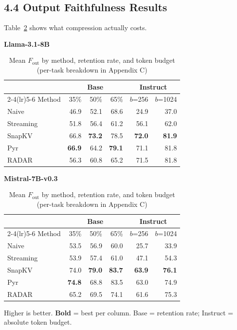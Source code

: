 \documentclass[10pt,letterpaper]{article}
\begin{document}
\hypertarget{output-faithfulness-results}{%
\subsection{4.4 Output Faithfulness
Results}\label{output-faithfulness-results}}

Table~\ref{tab:t4} shows what compression actually costs.

\begin{table}[H]
\centering
\small
\captionsetup{justification=centering}
\caption{Mean \(F_{\text{out}}\) by method, retention rate, and token budget (per-task breakdown in Appendix C)}
\label{tab:t4}
\begin{minipage}[t]{0.49\textwidth}
\centering
\textbf{Llama-3.1-8B}\\[0.4em]
\begin{tabular}{@{}lrrrrr@{}}
\toprule
& \multicolumn{3}{c}{Base} & \multicolumn{2}{c}{Instruct}\\
\cmidrule(lr){2-4}\cmidrule(lr){5-6}
Method & 35\% & 50\% & 65\% & $b$=256 & $b$=1024\\
\midrule
Naive      & 46.9 & 52.1 & 68.6 & 24.9 & 37.0\\
Streaming  & 51.8 & 56.4 & 61.2 & 56.1 & 62.0\\
SnapKV     & 66.8 & \textbf{73.2} & 78.5 & \textbf{72.0} & \textbf{81.9}\\
Pyr        & \textbf{66.9} & 64.2 & \textbf{79.1} & 71.1 & 81.8\\
RADAR      & 56.3 & 60.8 & 65.2 & 71.5 & 81.8\\
\bottomrule
\end{tabular}
\end{minipage}%
\hfill
\begin{minipage}[t]{0.49\textwidth}
\centering
\textbf{Mistral-7B-v0.3}\\[0.4em]
\begin{tabular}{@{}lrrrrr@{}}
\toprule
& \multicolumn{3}{c}{Base} & \multicolumn{2}{c}{Instruct}\\
\cmidrule(lr){2-4}\cmidrule(lr){5-6}
Method & 35\% & 50\% & 65\% & $b$=256 & $b$=1024\\
\midrule
Naive      & 53.5 & 56.9 & 60.0 & 25.7 & 33.9\\
Streaming  & 53.9 & 57.4 & 61.0 & 47.1 & 54.3\\
SnapKV     & 74.0 & \textbf{79.0} & \textbf{83.7} & \textbf{63.9} & \textbf{76.1}\\
Pyr        & \textbf{74.8} & 68.8 & 83.5 & 63.0 & 74.9\\
RADAR      & 65.2 & 69.5 & 74.1 & 61.6 & 75.3\\
\bottomrule
\end{tabular}
\end{minipage}
\par\smallskip
Higher is better. \textbf{Bold} = best per column. Base = retention rate; Instruct = absolute token budget.
\end{table}
\end{document}
